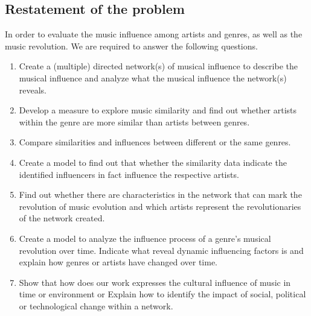 \documentclass[12pt]{article}
\begin{document}
\subsection{Restatement of the problem}
In order to evaluate the music influence among artists and genres, as well as the music revolution. We are required to answer the following questions.
\begin{enumerate}
    \item Create a (multiple) directed network(s) of musical influence to describe the musical influence and analyze what the musical influence the network(s) reveals.
    \item Develop a measure to explore music similarity and find out whether artists within the genre are more similar than artists between genres.
    \item Compare similarities and influences between different or the same genres. 
    \item Create a model to find out that whether the similarity data indicate the identified influencers in fact influence the respective artists.
    \item Find out whether there are characteristics in the network that can mark the revolution of music evolution and which artists represent the revolutionaries of the network created.
    \item Create a model to analyze the influence process of a genre's musical revolution over time. Indicate what reveal dynamic influencing factors is and explain how genres or artists have changed over time.
    \item Show that how does our work expresses the cultural influence of music in time or environment or Explain how to identify the impact of social, political or technological change within a network.
    
\end{enumerate}
\end{document}
